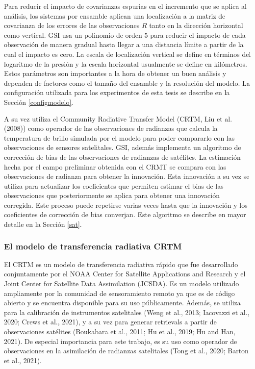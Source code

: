 \documentclass[12pt,oneside,a4paper]{reedthesis}
\begin{document}
Para reducir el impacto de covarianzas espurias en el incremento que se aplica al análisis, los sistemas por ensamble aplican una localización a la matriz de covarianza de los errores de las observaciones \(R\) tanto en la dirección horizontal como vertical.
GSI usa un polinomio de orden 5 para reducir el impacto de cada observación de manera gradual hasta llegar a una distancia límite a partir de la cual el impacto es cero. La escala de localización vertical se define en términos del logaritmo de la presión y la escala horizontal usualmente se define en kilómetros.
Estos parámetros son importantes a la hora de obtener un buen análisis y dependen de factores como el tamaño del ensamble y la resolución del modelo. La configuración utilizada para los experimentos de esta tesis se describe en la Sección \ref{configmodelo}.

A su vez utiliza el Community Radiative Transfer Model (CRTM, Liu et al. (2008)) como operador de las observaciones de radianzas que calcula la temperatura de brillo simulada por el modelo para poder compararlo con las observaciones de sensores satelitales.
GSI, además implementa un algoritmo de corrección de bias de las observaciones de radianzas de satélites.
La estimación hecha por el campo preliminar obtenida con el CRMT se compara con las observaciones de radianza para obtener la innovación.
Esta innovación a su vez se utiliza para actualizar los coeficientes que permiten estimar el bias de las observaciones que posteriormente se aplica para obtener una innovación corregida. Este proceso puede repetirse varias veces hasta que la innovación y los coeficientes de corrección de bias converjan.
Este algoritmo se describe en mayor detalle en la Sección \ref{sat}.

\hypertarget{el-modelo-de-transferencia-radiativa-crtm}{%
\subsubsection{El modelo de transferencia radiativa CRTM}\label{el-modelo-de-transferencia-radiativa-crtm}}

El CRTM es un modelo de transferencia radiativa rápido que fue desarrollado conjuntamente por el NOAA Center for Satellite Applications and Research y el Joint Center for Satellite Data Assimilation (JCSDA). Es un modelo utilizado ampliamente por la comunidad de sensoramiento remoto ya que es de código abierto y se encuentra disponible para su uso públicamente. Además, se utiliza para la calibración de instrumentos satelitales (Weng et al., 2013; Iacovazzi et al., 2020; Crews et al., 2021), y a su vez para generar retrievals a partir de observaciones satélites (Boukabara et al., 2011; Hu et al., 2019; Hu and Han, 2021). De especial importancia para este trabajo, es su uso como operador de observaciones en la asimilación de radianzas satelitales (Tong et al., 2020; Barton et al., 2021).
\end{document}
